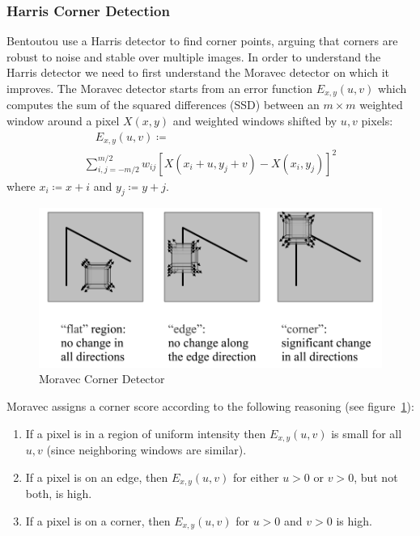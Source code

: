 \subsubsection{Harris Corner Detection}
Bentoutou \etal\cite{bentoutou2005automatic} use a Harris detector\cite{harris1988combined} to find corner points, arguing that corners are robust to noise and stable over multiple images.
%
In order to understand the Harris detector we need to first understand the Moravec\cite{moravec1980obstacle} detector on which it improves.
%
The Moravec detector starts from an error function \(E_{x,y}(u,v)\) which computes the sum of the squared differences (SSD) between an \(m \times m\) weighted window around a pixel \(X(x, y)\) and weighted windows shifted by \(u,v\) pixels:
\begin{multline}
	\quad E_{x,y}(u,v) \coloneqq \\ \sum_{i,j=-m/2}^{m/2} w_{ij}\left[ X(x_i+ u,y_j+v) - X(x_i, y_j)\right]^2
	\label{moravecerrorfunction}
\end{multline}
where \(x_i \coloneqq x + i\) and \(y_j \coloneqq y+j\).
\begin{figure}
	\centering
	\includegraphics[width=\linewidth,keepaspectratio]{figures/registration/corners.png}
	\caption{Moravec Corner Detector}
	\label{fig:corners}
\end{figure}
Moravec assigns a corner score according to the following reasoning (see figure~\ref{fig:corners}):
\begin{framed}
	\begin{enumerate}
		\item If a pixel is in a region of uniform intensity then \(E_{x,y}(u,v)\) is small for all \(u,v\) (since neighboring windows are similar).
		\item If a pixel is on an edge, then \(E_{x,y}(u,v)\) for either \(u > 0\) or \(v > 0\), but not both, is high.
		\item If a pixel is on a corner, then \(E_{x,y}(u,v)\) for \(u > 0\) and \(v > 0\) is high.
	\end{enumerate}
\end{framed}
